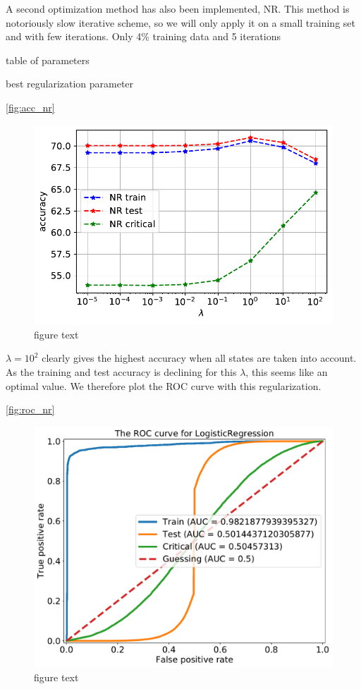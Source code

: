 A second optimization method has also been implemented, NR.
This method is notoriously slow iterative scheme, so we will only apply it on a small training set and with few iterations. Only 4\% training data and 5 iterations 

table of parameters

best regularization parameter

\autoref{fig:acc_nr}

\begin{figure}[H]
\begin{center}\includegraphics[scale=0.7]{latex/figures/log_acc_nr.pdf}
\end{center}
\caption{figure text}
\label{fig:acc_nr}
\end{figure}

$\lambda = 10^2$ clearly gives the highest accuracy when all states are taken into account. As the training and test accuracy is declining for this $\lambda$, this seems like an optimal value. We therefore plot the ROC curve with this regularization.

\autoref{fig:roc_nr}

\begin{figure}[H]
\begin{center}\includegraphics[scale=0.5]{latex/figures/logistic_roc_curve_nr.pdf}
\end{center}
\caption{figure text}
\label{fig:roc_nr}
\end{figure}

